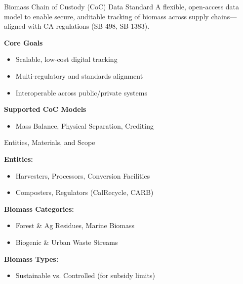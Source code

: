 \documentclass[presentation]{beamer}
\begin{document}
\begin{frame}{Biomass Chain of Custody (CoC) Data Standard}
\small
A flexible, open-access data model to enable secure, auditable tracking of biomass across supply chains—aligned with CA regulations (SB 498, SB 1383).

\vspace{1em}
\textbf{Core Goals}
\begin{itemize}[noitemsep]
    \item Scalable, low-cost digital tracking
    \item Multi-regulatory and standards alignment
    \item Interoperable across public/private systems
\end{itemize}

\vspace{0.5em}
\textbf{Supported CoC Models}
\begin{itemize}[noitemsep]
    \item Mass Balance, Physical Separation, Crediting
\end{itemize}
\end{frame}
\begin{frame}{Entities, Materials, and Scope}
\small

\textbf{Entities:}
\begin{itemize}[noitemsep]
    \item Harvesters, Processors, Conversion Facilities
    \item Composters, Regulators (CalRecycle, CARB)
\end{itemize}

\vspace{0.5em}
\textbf{Biomass Categories:}
\begin{itemize}[noitemsep]
    \item Forest & Ag Residues, Marine Biomass
    \item Biogenic & Urban Waste Streams
\end{itemize}

\vspace{0.5em}
\textbf{Biomass Types:}
\begin{itemize}[noitemsep]
    \item Sustainable vs. Controlled (for subsidy limits)
\end{itemize}

\end{frame}
\end{document}
